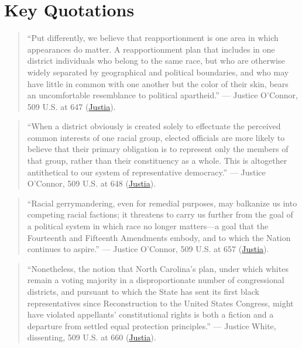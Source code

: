 \documentclass[12pt]{article}
\begin{document}
\section{Key Quotations}
\begin{quote}
``Put differently, we believe that reapportionment is one area in which appearances do matter. A reapportionment plan that includes in one district individuals who belong to the same race, but who are otherwise widely separated by geographical and political boundaries, and who may have little in common with one another but the color of their skin, bears an uncomfortable resemblance to political apartheid.'' --- Justice O'Connor, 509 U.S. at 647 (\href{https://supreme.justia.com/cases/federal/us/509/630/}{Justia}).
\end{quote}
\begin{quote}
``When a district obviously is created solely to effectuate the perceived common interests of one racial group, elected officials are more likely to believe that their primary obligation is to represent only the members of that group, rather than their constituency as a whole. This is altogether antithetical to our system of representative democracy.'' --- Justice O'Connor, 509 U.S. at 648 (\href{https://supreme.justia.com/cases/federal/us/509/630/}{Justia}).
\end{quote}
\begin{quote}
``Racial gerrymandering, even for remedial purposes, may balkanize us into competing racial factions; it threatens to carry us further from the goal of a political system in which race no longer matters---a goal that the Fourteenth and Fifteenth Amendments embody, and to which the Nation continues to aspire.'' --- Justice O'Connor, 509 U.S. at 657 (\href{https://supreme.justia.com/cases/federal/us/509/630/}{Justia}).
\end{quote}
\begin{quote}
``Nonetheless, the notion that North Carolina's plan, under which whites remain a voting majority in a disproportionate number of congressional districts, and pursuant to which the State has sent its first black representatives since Reconstruction to the United States Congress, might have violated appellants' constitutional rights is both a fiction and a departure from settled equal protection principles.'' --- Justice White, dissenting, 509 U.S. at 660 (\href{https://supreme.justia.com/cases/federal/us/509/630/}{Justia}).
\end{quote}
\end{document}
